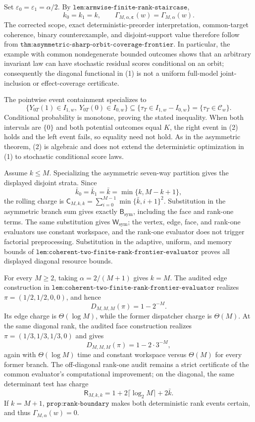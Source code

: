 Set \(\varepsilon_0=\varepsilon_1=\alpha/2\). By \(\texttt{lem:armwise-finite-rank-staircase}\),
\[
k_0=k_1=k,
\qquad
\Gamma_{M,\alpha,\boldsymbol\varepsilon}(w)=\Gamma_{M,\alpha}(w).
\tag{1}
\]
The corrected scope, exact deterministic-preorder interpretation, common-target coherence, binary counterexample, and disjoint-support value therefore follow from \(\texttt{thm:asymmetric-sharp-orbit-coverage-frontier}\). In particular, the example with common nondegenerate bounded outcomes shows that an arbitrary invariant law can have stochastic residual scores conditional on an orbit; consequently the diagonal functional in (1) is not a uniform full-model joint-inclusion or effect-coverage certificate.

The pointwise event containment specializes to
\[
\{Y_{0T}(1)\in I_{1,w},\ Y_{0T}(0)\in I_{0,w}\}
\subseteq
\{\tau_T\in I_{1,w}-I_{0,w}\}
=\{\tau_T\in\mathcal C_w\}.
\tag{2}
\]
Conditional probability is monotone, proving the stated inequality. When both intervals are \(\{0\}\) and both potential outcomes equal \(K\), the right event in (2) holds and the left event fails, so equality need not hold. As in the asymmetric theorem, (2) is algebraic and does not extend the deterministic optimization in (1) to stochastic conditional score laws.

Assume \(k\le M\). Specializing the asymmetric seven-way partition gives the displayed disjoint strata. Since
\[
\bar k_0=\bar k_1=\bar k=\min\{k,M-k+1\},
\]
the rolling charge is \(\mathsf C_{M,k,k}=\sum_{i=0}^{M-1}\min\{\bar k,i+1\}^2\). Substitution in the asymmetric branch sum gives exactly \(\mathsf B_{\mathrm{sym}}\), including the face and rank-one terms. The same substitution gives \(\mathsf W_{\mathrm{sym}}\); the vertex, edge, face, and rank-one evaluators use constant workspace, and the rank-one evaluator does not trigger factorial preprocessing. Substitution in the adaptive, uniform, and memory bounds of \(\texttt{lem:coherent-two-finite-rank-frontier-evaluator}\) proves all displayed diagonal resource bounds.

For every \(M\ge2\), taking \(\alpha=2/(M+1)\) gives \(k=M\). The audited edge construction in \(\texttt{lem:coherent-two-finite-rank-frontier-evaluator}\) realizes \(\pi=(1/2,1/2,0,0)\), and hence
\[
D_{M,M,M}(\pi)=1-2^{-M}.
\]
Its edge charge is \(\Theta(\log M)\), while the former dispatcher charge is \(\Theta(M)\). At the same diagonal rank, the audited face construction realizes \(\pi=(1/3,1/3,1/3,0)\) and gives
\[
D_{M,M,M}(\pi)=1-2\cdot3^{-M},
\]
again with \(\Theta(\log M)\) time and constant workspace versus \(\Theta(M)\) for every former branch. The off-diagonal rank-one audit remains a strict certificate of the common evaluator's computational improvement; on the diagonal, the same determinant test has charge
\[
\mathsf R_{M,k,k}=1+2\lceil\log_2M\rceil+2\bar k.
\]
If \(k=M+1\), \(\texttt{prop:rank-boundary}\) makes both deterministic rank events certain, and thus \(\Gamma_{M,\alpha}(w)=0\).

